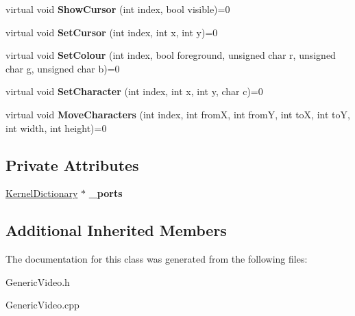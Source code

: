\begin{DoxyCompactItemize}
virtual void {\bfseries Show\+Cursor} (int index, bool visible)=0
\item 
\mbox{\label{class_generic_video_ad27368c06533fa4d5ede9363b8692a56}} 
virtual void {\bfseries Set\+Cursor} (int index, int x, int y)=0
\item 
\mbox{\label{class_generic_video_a524776693a54935ce59bf0d949504bb1}} 
virtual void {\bfseries Set\+Colour} (int index, bool foreground, unsigned char r, unsigned char g, unsigned char b)=0
\item 
\mbox{\label{class_generic_video_a0668a2e5722901419c0fd9249e235a12}} 
virtual void {\bfseries Set\+Character} (int index, int x, int y, char c)=0
\item 
\mbox{\label{class_generic_video_a6eba3c9ae7d4b98690ff0ae298befd4f}} 
virtual void {\bfseries Move\+Characters} (int index, int fromX, int fromY, int toX, int toY, int width, int height)=0
\end{DoxyCompactItemize}
\subsection*{Private Attributes}
\begin{DoxyCompactItemize}
\item 
\mbox{\label{class_generic_video_a0e7c619087fdb7eb9b1f847c178fa7ad}} 
\hyperlink{class_kernel_dictionary}{Kernel\+Dictionary} $\ast$ {\bfseries \+\_\+ports}
\end{DoxyCompactItemize}
\subsection*{Additional Inherited Members}


The documentation for this class was generated from the following files\+:\begin{DoxyCompactItemize}
\item 
Generic\+Video.\+h\item 
Generic\+Video.\+cpp\end{DoxyCompactItemize}
